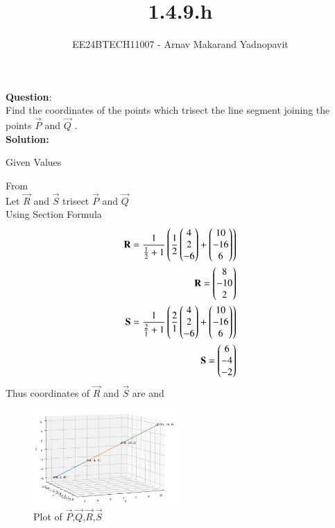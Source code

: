 \documentclass[journal]{IEEEtran}
\begin{document}

\title{1.4.9.h}
\author{EE24BTECH11007 - Arnav Makarand Yadnopavit}
{\let\newpage\relax\maketitle}
\renewcommand{\thefigure}{\theenumi}
\renewcommand{\thetable}{\theenumi}
\setlength{\intextsep}{10pt} %
\renewcommand{\thetable}{\theenumi}
\textbf{Question}:\\
Find the coordinates of the points which trisect the line segment joining the points
$\vec{P}$  and $\vec{Q}$ .\\
\textbf{Solution:}
\begin{table}[h]
    \centering
    
    \caption{Given Values}
    \label{tab:1}
\end{table}
From \\
Let $\vec{R}$ and $\vec{S}$ trisect $\vec{P}$ and $\vec{Q}$\\
Using Section Formula
\begin{align}
\mathbf{R}=\frac{1}{\frac{1}{2}+1}\left(\frac{1}{2}\begin{pmatrix}4\\2\\-6\end{pmatrix}+\begin{pmatrix}10\\-16\\6\end{pmatrix}\right)\\
\mathbf{R}=\begin{pmatrix}8\\-10\\2\end{pmatrix}\\
\mathbf{S}=\frac{1}{\frac{2}{1}+1}\left(\frac{2}{1}\begin{pmatrix}4\\2\\-6\end{pmatrix}+\begin{pmatrix}10\\-16\\6\end{pmatrix}\right)\\
\mathbf{S}=\begin{pmatrix}6\\-4\\-2\end{pmatrix}
\end{align}
Thus coordinates of $\vec{R}$ and $\vec{S}$ are  and  
\begin{figure}[h]
    \centering
    \includegraphics[width=5.5cm]{figs/fig.png}
    \caption{Plot of $\vec{P}$,$\vec{Q}$,$\vec{R}$,$\vec{S}$}
 \end{figure}
\end{document}
